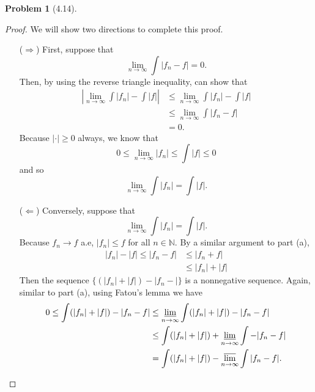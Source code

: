 \documentclass[12pt]{article}
\newcommand{\N}{\mathbb{N}}
\theoremstyle{definition}
\newtheorem{problem}{Problem}
\begin{document}
\begin{problem}[4.14]
\begin{enumerate}[label = (\alph{*})]
            \begin{proof}
                We will show two directions to complete this proof.
                \begin{enumerate}
                    \item[(\(\Rightarrow\))] First, suppose that 
                        \[
                            \lim_{n \to \infty} \int |f_n - f| = 0.  
                        \]
                    Then, by using the reverse triangle inequality, can show that 
                        \begin{align*}
                            \left| \lim_{n \to \infty} \int |f_n| - \int |f| \right| &\leq \lim_{n \to \infty} \int |f_n| - \int |f| \\
                            &\leq \lim_{n \to \infty} \int |f_n - f| \\
                            &= 0.
                        \end{align*}
                    Because \( |\cdot | \geq 0 \) always, we know that
                        \[
                            0 \leq \lim_{n \to \infty} |f_n| \leq \int |f| \leq 0  
                        \]
                    and so 
                        \[
                            \lim_{n \to \infty} \int |f_n| = \int |f|.
                        \]
                    \item[(\(\Leftarrow\))] Conversely, suppose that 
                        \[
                            \lim_{n \to \infty} \int |f_n| = \int |f|.  
                        \]
                    Because \( f_n \to f \) a.e, \( |f_n| \leq f \) for all \( n \in \N \). By a similar argument to part (a),
                    \begin{align*}
                        |f_n| - |f| \leq |f_n - f| &\leq |f_n + f| \\
                        &\leq |f_n| + |f|  
                    \end{align*}
                    Then the sequence \( \{ (|f_n| + |f|) - |f_n - | \}\) is a nonnegative sequence. Again, similar to part (a), using Fatou's lemma we have
                    \begin{align*}
                        0 \leq \int (|f_n| + |f|) - |f_n - f| &\leq \varliminf_{n \to \infty} \int (|f_n|+ |f|) - |f_n - f| \\
                        &\leq \int (|f_n| + |f|) + \varliminf_{n \to \infty} \int - |f_n - f| \\
                        &= \int (|f_n| + |f|) - \varlimsup_{n \to \infty} \int |f_n - f|.

\end{align*}
\end{enumerate}
\end{proof}
\end{enumerate}
\end{problem}
\end{document}
